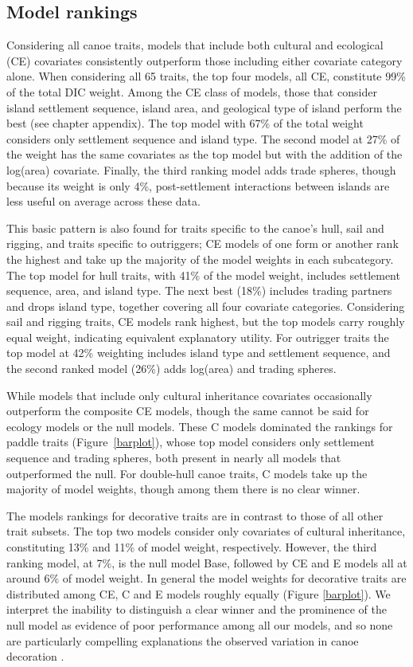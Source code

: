  \subsection{Model rankings}   

Considering all canoe traits, models that include both cultural and ecological (CE) covariates consistently outperform those including either covariate category alone.  When considering all 65 traits, the top four models, all CE, constitute 99\% of the total DIC weight. Among the CE class of models, those that consider island settlement sequence, island area, and geological type of island perform the best (see chapter appendix). The top model with 67\% of the total weight considers only settlement sequence and island type.  The second model at 27\% of the weight has the same covariates as the top model but with the addition of the log(area) covariate. Finally, the third ranking model adds trade spheres, though because its weight is only 4\%, post-settlement interactions between islands are less useful on average across these data.

This basic pattern is also found for traits specific to the canoe's hull, sail and rigging, and traits specific to outriggers; CE models of one form or another rank the highest and take up the majority of the model weights in each subcategory.  The top model for hull traits, with 41\% of the model weight, includes settlement sequence, area, and island type. The next best (18\%) includes trading partners and drops island type, together covering all four covariate categories.  Considering sail and rigging traits, CE models rank highest, but the top models carry roughly equal weight, indicating equivalent explanatory utility.  For outrigger traits the top model at 42\% weighting includes island type and settlement sequence, and the second ranked model (26\%) adds log(area) and trading spheres. 

While models that include only cultural inheritance covariates occasionally outperform the composite CE models, though the same cannot be said for ecology models or the null models.  These C models dominated the rankings for paddle traits (Figure~\ref{barplot}), whose top model considers only settlement sequence and trading spheres, both present in nearly all models that outperformed the null.  For double-hull canoe traits, C models take up the majority of model weights, though among them there is no clear winner.  

The models rankings for decorative traits are in contrast to those of all other trait subsets.  The top two models consider only covariates of cultural inheritance, constituting 13\% and 11\% of model weight, respectively.  However, the third ranking model, at 7\%, is the null model Base, followed by CE and E models all at around 6\% of model weight.  In general the model weights for decorative traits are distributed among CE, C and E models roughly equally (Figure \ref{barplot}).  We interpret the inability to distinguish a clear winner and the prominence of the null model as evidence of poor performance among all our models, and so none are particularly compelling explanations the observed variation in canoe decoration \citep{Burnham&Anderson:2002}.  
 

